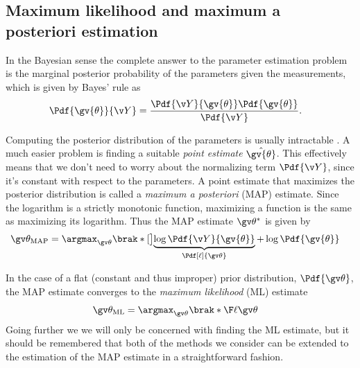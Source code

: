 \subsection{Maximum likelihood and maximum a posteriori estimation}%

In the Bayesian sense the complete answer to the parameter estimation
problem is the marginal posterior probability of the parameters
given the measurements, which is given by Bayes' rule as
\begin{align}
	\Pdf{\gv{\theta}}{\Y}&=\frac{\Pdf{\Y}{\gv{\theta}}\Pdf{\gv{\theta}}}{\Pdf{\Y}}.
	\label{eq:param_post}
\end{align}

Computing the posterior distribution of the parameters is usually intractable . A much
easier problem is finding a suitable \emph{point estimate} $\hat{\gv{\theta}}$.
This effectively means that we don't need to worry about the normalizing
term $\Pdf{\Y}$, since it's constant with respect to the parameters. 
A point estimate that maximizes the posterior distribution
is called a \emph{maximum a posteriori} (MAP) estimate. 
Since the logarithm is a strictly monotonic function, maximizing a function
is the same as maximizing its logarithm. Thus the MAP estimate $\Th^*$ is given by 
\begin{align}
	\Th_{\text{MAP}} &= \argmax_{\Th}\brak*[\big]{\underbrace{\log \Pdf{\Y}{\gv{\theta}}}_{\Pdf[\ell]{\Th}} + \log\Pdf{\gv{\theta}}}
	\label{eq:MAP}
\end{align}

In the case of a flat (constant and thus improper)
prior distribution, $\Pdf{\Th}$, the MAP estimate converges to the
\emph{maximum likelihood} (ML) estimate
\begin{align}
	\Th_{\text{ML}} &= \argmax_{\Th}\brak*\lLH
	\label{eq:ML}
\end{align}
Going further we we will only be concerned with finding the ML estimate, but it should
be remembered that both of the methods we consider can be extended
to the estimation of the MAP estimate in a straightforward fashion.

